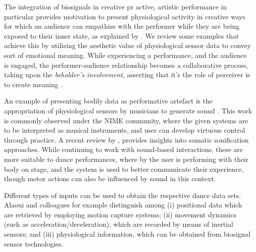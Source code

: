 The integration of biosignals in creative pr active, artistic performance in particular provides motivation to present physiological activity in creative ways for which an audience can empathise with the performer while they are being exposed to their inner state, as explained by \citeauthor{francoise_designing_2017} \cite{francoise_designing_2017}. We review some examples that achieve this by utilising the aesthetic value of physiological sensor data to convey sort of emotional meaning. While experiencing a performance, and the audience is engaged, the performer-audience relationship becomes a collaborative process, taking upon the \textit{beholder's involvement}, asserting that it's the role of perceiver is to create meaning \cite{kandel_age_2012}.

An example of presenting bodily data as performative artefact is the appropriation of physiological sensors by musicians to generate sound \cite{aly_appropriating_2021}.
This work is commonly observed under the NIME community, where the given systems are to be interpreted as musical instruments, and user can develop virtuous control through practice. A recent review by \citeauthor{giomi_somatic_2020}, provides insights into somatic sonification approaches. While continuing to work with sound-based interactions, these are more suitable to dance performances, where by the user is performing with their body on stage, and the system is used to better communicate their experience, though motor actions can also be influenced by sound in this context.

Different types of inputs can be used to obtain the respective dance data sets. Alaoui and colleagues \cite{fdili2017seeing} for example distinguish among (i) positional data which are retrieved by employing motion capture systems; (ii) movement dynamics (such as acceleration/deceleration), which are recorded by means of inertial sensors; and (iii) physiological information, which can be obtained from biosignal sensor technologies.


